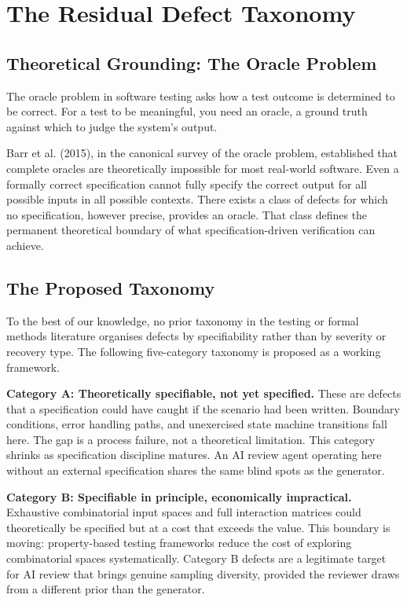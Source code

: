 \documentclass{article}
\begin{document}
\section{The Residual Defect Taxonomy}

\subsection{Theoretical Grounding: The Oracle Problem}

The oracle problem in software testing asks how a test outcome is
determined to be correct. For a test to be meaningful, you need an oracle,
a ground truth against which to judge the system's output.

Barr et al. (2015), in the canonical survey of the oracle problem,
established that complete oracles are theoretically impossible for most
real-world software. Even a formally correct specification cannot fully
specify the correct output for all possible inputs in all possible
contexts. There exists a class of defects for which no specification,
however precise, provides an oracle. That class defines the permanent
theoretical boundary of what specification-driven verification can achieve.

\subsection{The Proposed Taxonomy}

To the best of our knowledge, no prior taxonomy in the testing or formal methods literature
organises defects by specifiability rather than by severity or recovery
type. The following five-category taxonomy is
proposed as a working framework.

\textbf{Category A: Theoretically specifiable, not yet specified.} These are
defects that a specification could have caught if the scenario had been
written. Boundary conditions, error handling paths, and unexercised state
machine transitions fall here. The gap is a process failure, not a
theoretical limitation. This category shrinks as specification discipline
matures. An AI review agent operating here without an external
specification shares the same blind spots as the generator.

\textbf{Category B: Specifiable in principle, economically impractical.}
Exhaustive combinatorial input spaces and full interaction matrices could
theoretically be specified but at a cost that exceeds the value. This
boundary is moving: property-based testing frameworks reduce the cost of
exploring combinatorial spaces systematically. Category B defects are a
legitimate target for AI review that brings genuine sampling diversity,
provided the reviewer draws from a different prior than the generator.
\end{document}
